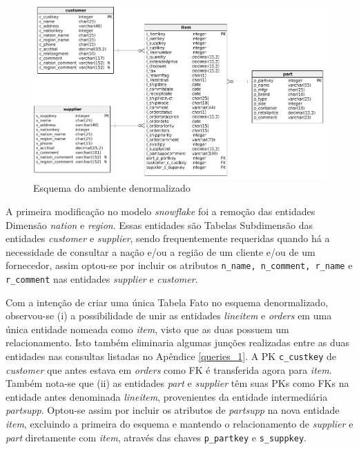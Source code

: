 \begin{figure}[h]
	\centering
		\includegraphics[width=\textwidth]{img/star.png}
	\caption{Esquema do ambiente denormalizado}
	\label{fig:star}
\end{figure}
 
A primeira modificação no modelo \textit{snowflake} foi a remoção das entidades Dimensão \textit{nation} e \textit{region}. Essas entidades são Tabelas Subdimensão das entidades \textit{customer} e \textit{supplier}, sendo frequentemente requeridas quando há a necessidade de consultar a nação e/ou a região de um cliente e/ou de um fornecedor, assim optou-se por incluir os atributos \texttt{n\_name, n\_comment, r\_name} e \texttt{r\_comment} nas entidades \textit{supplier} e \textit{customer}. 

Com a intenção de criar uma única Tabela Fato no esquema denormalizado, observou-se (i) a possibilidade de unir as entidades \textit{lineitem} e \textit{orders} em uma única entidade nomeada como \textit{item}, visto que as duas possuem um relacionamento. Isto também eliminaria algumas junções realizadas entre as duas entidades nas consultas listadas no Apêndice \ref{queries_1}. A PK \texttt{c\_custkey} de \textit{customer} que antes estava em \textit{orders} como FK é transferida agora para \textit{item}. Também nota-se que (ii) as entidades \textit{part} e \textit{supplier} têm suas PKs como FKs na entidade antes denominada \textit{lineitem}, provenientes da entidade intermediária \textit{partsupp}. Optou-se assim por incluir os atributos de \textit{partsupp} na nova entidade \textit{item}, excluindo a primeira do esquema e mantendo o relacionamento de \textit{supplier} e \textit{part} diretamente com \textit{item}, através das chaves \texttt{p\_partkey} e \texttt{s\_suppkey}.

